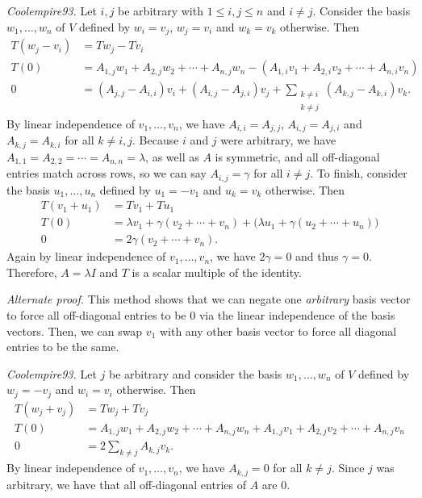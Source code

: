 \begin{exc}
\begin{solution}
\emph{Coolempire93.} Let $i,j$ be arbitrary with $1\le i,j\le n$ and $i\ne j$.
Consider the basis $w_1,\dots,w_n$ of $V$ defined by $w_i=v_j$, $w_j=v_i$ and
$w_k=v_k$ otherwise. Then
\begin{align*}
T(w_j-v_i) &= Tw_j-Tv_i\\
T(0) &= A_{1,j}w_1+A_{2,j}w_2+\cdots+A_{n,j}w_n
        -(A_{1,i}v_1+A_{2,i}v_2+\cdots+A_{n,i}v_n)\\
0 &= (A_{j,j}-A_{i,i})v_i+(A_{i,j}-A_{j,i})v_j
     +\sum_{\substack{k\ne i\\ k\ne j}}(A_{k,j}-A_{k,i})v_k.
\end{align*}
By linear independence of $v_1,\dots,v_n$, we have $A_{i,i}=A_{j,j}$,
$A_{i,j}=A_{j,i}$ and $A_{k,j}=A_{k,i}$ for all $k\ne i,j$. Because $i$ and $j$
were arbitrary, we have $A_{1,1}=A_{2,2}=\cdots=A_{n,n}=\lambda$, as well as $A$
is symmetric, and all off-diagonal entries match across rows, so we can say
$A_{i,j}=\gamma$ for all $i\ne j$. To finish, consider the basis
$u_1,\dots,u_n$ defined by $u_1=-v_1$ and $u_k=v_k$ otherwise. Then
\begin{align*}
T(v_1+u_1) &= Tv_1+Tu_1\\
T(0) &= \lambda v_1+\gamma(v_2+\cdots+v_n)
        +\bigl(\lambda u_1+\gamma(u_2+\cdots+u_n)\bigr)\\
0 &= 2\gamma(v_2+\cdots+v_n).
\end{align*}
Again by linear independence of $v_1,\dots,v_n$, we have $2\gamma=0$ and thus
$\gamma=0$. Therefore, $A=\lambda I$ and $T$ is a scalar multiple of the
identity.

\emph{Alternate proof.} This method shows that we can negate one
\emph{arbitrary} basis vector to force
all off-diagonal entries to be $0$ via the linear independence of the basis
vectors. Then, we can swap $v_1$ with any other basis vector to force all
diagonal entries to be the same.

\emph{Coolempire93.} Let $j$ be arbitrary and consider the basis
$w_1,\dots,w_n$ of $V$ defined by $w_j=-v_j$ and $w_i=v_i$ otherwise. Then
\begin{align*}
T(w_j+v_j) &= Tw_j+Tv_j\\
T(0) &= A_{1,j}w_1+A_{2,j}w_2+\cdots+A_{n,j}w_n
        +A_{1,j}v_1+A_{2,j}v_2+\cdots+A_{n,j}v_n\\
0 &= 2\sum_{k\ne j}A_{k,j}v_k.
\end{align*}
By linear independence of $v_1,\dots,v_n$, we have $A_{k,j}=0$ for all $k\ne j$.
Since $j$ was arbitrary, we have that all off-diagonal entries of $A$ are $0$.


\end{solution}
\end{exc}
